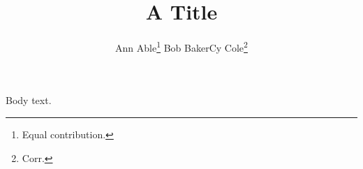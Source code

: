 \documentclass{article}
\newcommand{\samethanks}[1][\value{footnote}]{\footnotemark[#1]}
\begin{document}
\title{A Title}
\author{Ann Able\thanks{Equal contribution.} \And Bob Baker\samethanks \And Cy Cole\thanks{Corr.}}
\maketitle
Body text.
\end{document}
